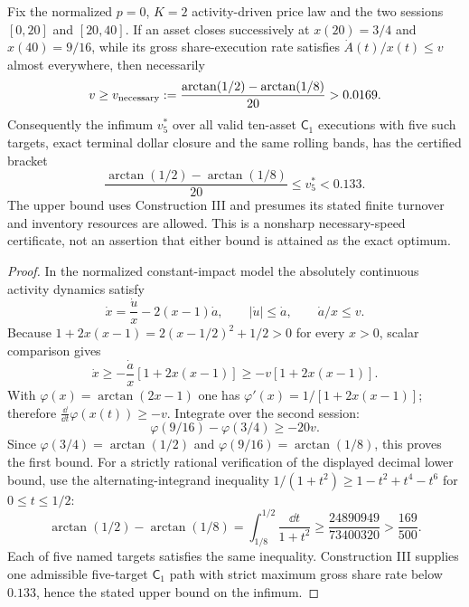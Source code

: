 \documentclass[review,hidelinks,onefignum,onetabnum]{siamonline250211}%
\begin{document}
\begin{proposition}
\label{prop:two-day-rate-lower}
Fix the normalized $p=0$, $K=2$ activity-driven
price law and the two sessions $[0,20]$ and $[20,40]$.
If an asset closes successively at $x(20)=3/4$ and
$x(40)=9/16$, while its gross share-execution rate
satisfies $\dot A(t)/x(t)\le v$ almost everywhere,
then necessarily
\begin{equation}\label{eq:two-day-rate-lower}
 v\ge
 v_{\rm necessary}:=
 \frac{\arctan(1/2)-\arctan(1/8)}{20}
 >0.0169.
\end{equation}
Consequently the infimum $v^*_5$ over all valid
ten-asset $\mathsf C_1$ executions with five such
targets, exact terminal dollar closure and the
same rolling bands, has the certified bracket
\begin{equation}\label{eq:five-rate-bracket}
 \frac{\arctan(1/2)-\arctan(1/8)}{20}
 \le v^*_5<0.133.
\end{equation}
The upper bound uses Construction III and presumes
its stated finite turnover and inventory resources
are allowed. This is a nonsharp necessary-speed
certificate, not an assertion that either bound is
attained as the exact optimum.
\end{proposition}
\begin{proof}
In the normalized constant-impact model the
absolutely continuous activity dynamics satisfy
\[
 \dot x=\frac{\dot u}{x}-2(x-1)\dot a,\qquad
 |\dot u|\le\dot a,\qquad \dot a/x\le v.
\]
Because $1+2x(x-1)=2(x-1/2)^2+1/2>0$
for every $x>0$, scalar comparison gives
\[
 \dot x\ge-\frac{\dot a}{x}
                  [1+2x(x-1)]
         \ge-v[1+2x(x-1)].
\]
With $\varphi(x)=\arctan(2x-1)$ one has
$\varphi'(x)=1/[1+2x(x-1)]$; therefore
$\frac{\dd}{\dd t}\varphi(x(t))\ge-v$.
Integrate over the second session:
\[
 \varphi(9/16)-\varphi(3/4)\ge-20v.
\]
Since $\varphi(3/4)=\arctan(1/2)$
and $\varphi(9/16)=\arctan(1/8)$, this
proves the first bound. For a strictly rational
verification of the displayed decimal lower bound,
use the alternating-integrand inequality
$1/(1+t^2)\ge1-t^2+t^4-t^6$ for $0\le t\le1/2$:
\[
 \arctan(1/2)-\arctan(1/8)
 =\int_{1/8}^{1/2}\frac{\dd t}{1+t^2}
 \ge\frac{24890949}{73400320}
 >\frac{169}{500}.
\]
Each of five named
targets satisfies the same inequality.
Construction III supplies one admissible
five-target $\mathsf C_1$ path with strict
maximum gross share rate below $0.133$,
hence the stated upper bound on the infimum.
\end{proof}
\end{document}
